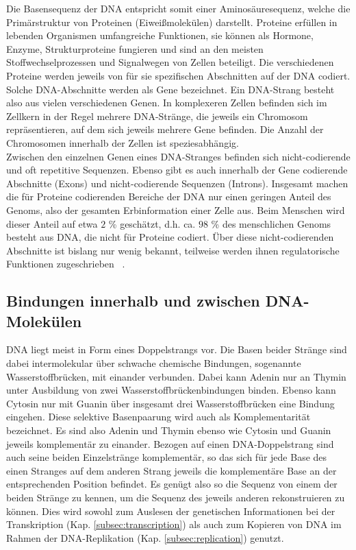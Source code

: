 Die Basensequenz der DNA entspricht somit einer Aminosäuresequenz, welche die Primärstruktur von Proteinen (Eiweißmolekülen) darstellt. Proteine erfüllen in lebenden Organismen umfangreiche Funktionen, sie können als Hormone, Enzyme, Strukturproteine fungieren und sind an den meisten Stoffwechselprozessen und Signalwegen von Zellen beteiligt. Die verschiedenen Proteine werden jeweils von für sie spezifischen Abschnitten auf der DNA codiert. Solche DNA-Abschnitte werden als Gene bezeichnet. Ein DNA-Strang besteht also aus vielen verschiedenen Genen. In komplexeren Zellen befinden sich im Zellkern in der Regel mehrere DNA-Stränge, die jeweils ein Chromosom repräsentieren, auf dem sich jeweils mehrere Gene befinden. Die Anzahl der Chromosomen innerhalb der Zellen ist speziesabhängig. \\

Zwischen den einzelnen Genen eines DNA-Stranges befinden sich nicht-codierende und oft repetitive Sequenzen. Ebenso gibt es auch innerhalb der Gene codierende Abschnitte (Exons) und nicht-codierende Sequenzen (Introns). Insgesamt machen die für Proteine codierenden Bereiche der DNA nur einen geringen Anteil des Genoms, also der gesamten Erbinformation einer Zelle aus. Beim Menschen wird dieser Anteil auf etwa $2$ \% geschätzt, d.h. ca. $ 98 $ \% des menschlichen Genoms besteht aus DNA, die nicht für Proteine codiert. Über diese nicht-codierenden Abschnitte ist bislang nur wenig bekannt, teilweise werden ihnen regulatorische Funktionen zugeschrieben ~\cite{dunham_2012, tsagakis_2020}. \\

\subsection{Bindungen innerhalb und zwischen DNA-Molekülen} \label{subsec:double_strand}

DNA liegt meist in Form eines Doppelstrangs vor. Die Basen beider Stränge sind dabei intermolekular über schwache chemische Bindungen, sogenannte Wasserstoffbrücken, mit einander verbunden. Dabei kann Adenin nur an Thymin unter Ausbildung von zwei Wasserstoffbrückenbindungen binden. Ebenso kann Cytosin nur mit Guanin über insgesamt drei Wasserstoffbrücken eine Bindung eingehen. Diese selektive Basenpaarung wird auch als Komplementarität bezeichnet. Es sind also Adenin und Thymin ebenso wie Cytosin und Guanin jeweils komplementär zu einander. Bezogen auf einen DNA-Doppelstrang sind auch seine beiden Einzelstränge komplementär, so das sich für jede Base des einen Stranges auf dem anderen Strang jeweils die komplementäre Base an der entsprechenden Position befindet. Es genügt also so die Sequenz von einem der beiden Stränge zu kennen, um die Sequenz des jeweils anderen rekonstruieren zu können. Dies wird sowohl zum Auslesen der genetischen Informationen bei der Transkription (Kap. \ref{subsec:transcription}) als auch zum Kopieren von DNA im Rahmen der DNA-Replikation (Kap. \ref{subsec:replication}) genutzt. \\

